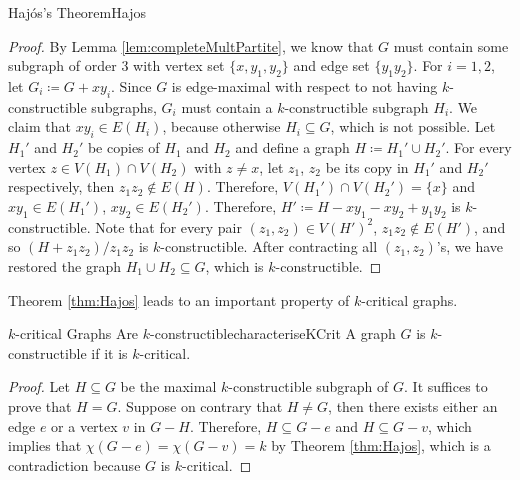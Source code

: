 \documentclass[math, code]{amznotes}
\theoremstyle{remark}
\begin{document}
\begin{thmbox}{Haj\'{o}s's Theorem}{Hajos}
\begin{proof}
        By Lemma \ref{lem:completeMultPartite}, we know that $G$ must contain some subgraph of order $3$ with vertex set $\{x, y_1, y_2\}$ and edge set $\{y_1y_2\}$. For $i = 1, 2$, let $G_i \coloneqq G + xy_i$. Since $G$ is edge-maximal with respect to not having $k$-constructible subgraphs, $G_i$ must contain a $k$-constructible subgraph $H_i$. We claim that $xy_i \in E(H_i)$, because otherwise $H_i \subseteq G$, which is not possible. Let $H_1'$ and $H_2'$ be copies of $H_1$ and $H_2$ and define a graph $H \coloneqq H_1' \cup H_2'$. For every vertex $z \in V(H_1) \cap V(H_2)$ with $z \neq x$, let $z_1$, $z_2$ be its copy in $H_1'$ and $H_2'$ respectively, then $z_1z_2 \notin E(H)$. Therefore, $V(H_1') \cap V(H_2') = \{x\}$ and $xy_1 \in E(H_1')$, $xy_2 \in E(H_2')$. Therefore, $H' \coloneqq H - xy_1 - xy_2 + y_1y_2$ is $k$-constructible. Note that for every pair $(z_1, z_2) \in V(H')^2$, $z_1z_2 \notin E(H')$, and so $(H + z_1z_2)/z_1z_2$ is $k$-constructible. After contracting all $(z_1, z_2)$'s, we have restored the graph $H_1 \cup H_2 \subseteq G$, which is $k$-constructible.
    \end{proof}
\end{thmbox}
Theorem \ref{thm:Hajos} leads to an important property of $k$-critical graphs.
\begin{corbox}{$k$-critical Graphs Are $k$-constructible}{characteriseKCrit}
    A graph $G$ is $k$-constructible if it is $k$-critical. 
    \tcblower
    \begin{proof}
        Let $H \subseteq G$ be the maximal $k$-constructible subgraph of $G$. It suffices to prove that $H = G$. Suppose on contrary that $H \neq G$, then there exists either an edge $e$ or a vertex $v$ in $G - H$. Therefore, $H \subseteq G - e$ and $H \subseteq G - v$, which implies that $\chi(G - e) = \chi(G - v) = k$ by Theorem \ref{thm:Hajos}, which is a contradiction because $G$ is $k$-critical.
    \end{proof}
\end{corbox}
\end{document}

